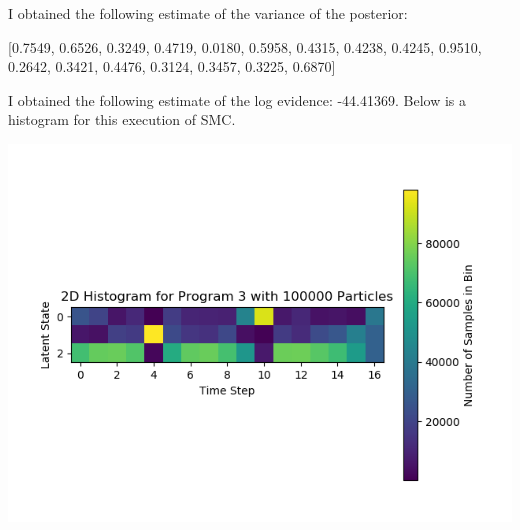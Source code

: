 \documentclass[11pt]{article}
\theoremstyle{definition}
\begin{document}
I obtained the following estimate of the variance of the posterior:

[0.7549, 0.6526, 0.3249, 0.4719, 0.0180, 0.5958, 0.4315, 0.4238, 0.4245, 0.9510, 0.2642, 0.3421, 0.4476, 0.3124, 0.3457, 0.3225, 0.6870]

I obtained the following estimate of the log evidence:  -44.41369. Below is a histogram for this execution of SMC.

\begin{center}
\includegraphics[scale=0.5]{../plots/P3NP100000.png}
\end{center}
\end{document}
